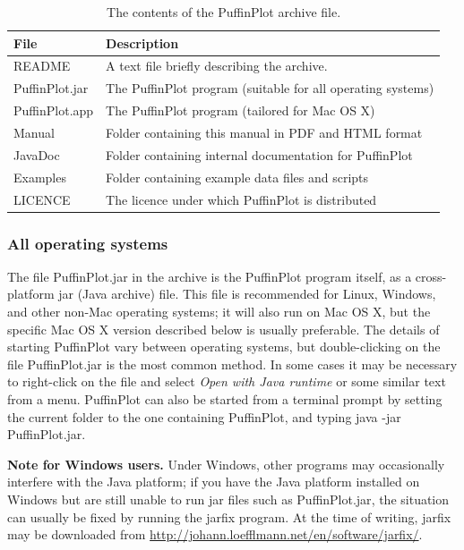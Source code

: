 \documentclass[a4paper,british]{article}
\newcommand{\ppcmd}[1]{\textsf{#1}} %
\begin{document}
\begin{table}[bp]
  \caption{\label{tbl:archive-contents} The contents of the PuffinPlot archive file.}
\begin{tabular}{ll} \toprule
File           & Description \\ \midrule
README         & A text file briefly describing the archive. \\
PuffinPlot.jar & The PuffinPlot program (suitable for all operating systems) \\
PuffinPlot.app & The PuffinPlot program (tailored for Mac OS X) \\
Manual         & Folder containing this manual in PDF and HTML format \\
JavaDoc        & Folder containing internal documentation for PuffinPlot \\
Examples       & Folder containing example data files and scripts\\
LICENCE        & The licence under which PuffinPlot is distributed \\
\bottomrule
\end{tabular}
\end{table}

\subsubsection{All operating systems}

The file \textsf{PuffinPlot.jar} in the archive is the PuffinPlot program
itself, as a cross-platform jar (Java archive) file. This file is recommended
for Linux, Windows, and other non-Mac operating systems; it will also run on
Mac OS X, but the specific Mac OS X version described below is usually
preferable. The details of starting PuffinPlot vary between operating
systems, but double-clicking on the file \textsf{PuffinPlot.jar} is the most
common method. In some cases it may be necessary to right-click on the file
and select \emph{Open with Java runtime} or some similar text from a menu.
PuffinPlot can also be started from a terminal prompt by setting the current
folder to the one containing PuffinPlot, and typing \textsf{java -jar
  PuffinPlot.jar}.

\textbf{Note for Windows users.} Under Windows, other programs may
occasionally interfere with the Java platform; if you have the Java platform
installed on Windows but are still unable to run \ppcmd{jar} files such as
\ppcmd{PuffinPlot.jar}, the situation can usually be fixed by running the
\ppcmd{jarfix} program. At the time of writing, \ppcmd{jarfix} may be
downloaded from \url{http://johann.loefflmann.net/en/software/jarfix/}.
\end{document}
